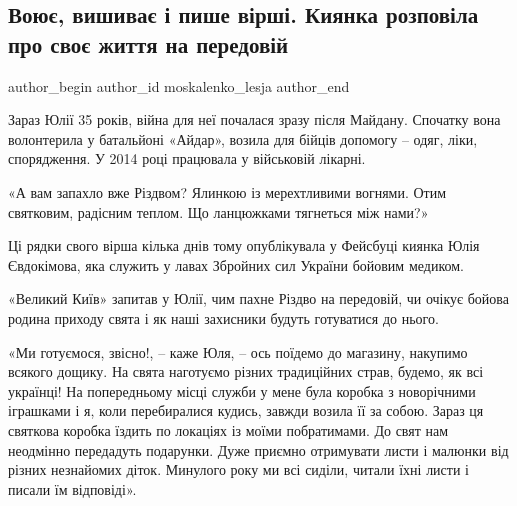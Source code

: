  
 
 
 
 
\subsection{Воює, вишиває і пише вірші. Киянка розповіла про своє життя на передовій}
\label{sec:07_12_2021.stz.kiev.bigkyiv.1.kyanka_peredovaja_vojna}


\ifcmt
 author_begin
   author_id moskalenko_lesja
 author_end
\fi

Зараз Юлії 35 років, війна для неї почалася зразу після Майдану. Спочатку вона
волонтерила у батальйоні «Айдар», возила для бійців допомогу – одяг, ліки,
спорядження. У 2014 році працювала у військовій лікарні.

\begin{zzquote}
«А вам запахло вже Різдвом?
Ялинкою із мерехтливими вогнями.
Отим святковим, радісним теплом.
Що ланцюжками тягнеться між нами?»
\end{zzquote}


Ці рядки свого вірша кілька днів тому опублікувала у Фейсбуці киянка Юлія
Євдокімова, яка служить у лавах Збройних сил України бойовим медиком.

«Великий Київ» запитав у Юлії, чим пахне Різдво на передовій, чи очікує бойова
родина приходу свята і як наші захисники будуть готуватися до нього.

«Ми готуємося, звісно!, – каже Юля, – ось поїдемо до магазину, накупимо всякого
дощику. На свята наготуємо різних традиційних страв, будемо, як всі українці!
На попередньому місці служби у мене була коробка з новорічними іграшками і я,
коли перебиралися кудись, завжди возила її за собою. Зараз ця святкова коробка
їздить по локаціях із моїми побратимами. До свят нам неодмінно передадуть
подарунки. Дуже приємно отримувати листи і малюнки від різних незнайомих діток.
Минулого року ми всі сиділи, читали їхні листи і писали їм відповіді».


